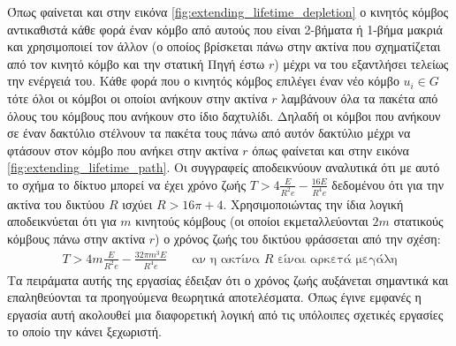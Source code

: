 Όπως φαίνεται και στην εικόνα \ref{fig:extending_lifetime_depletion} ο κινητός κόμβος αντικαθιστά κάθε φορά έναν κόμβο από αυτούς που είναι 2-βήματα ή 1-βήμα μακριά
και χρησιμοποιεί τον άλλον (ο οποίος βρίσκεται πάνω στην ακτίνα που σχηματίζεται από τον κινητό κόμβο και την στατική Πηγή έστω $r$) μέχρι να του εξαντλήσει τελείως
την ενέργειά του. Κάθε φορά που ο κινητός κόμβος επιλέγει έναν νέο κόμβο $u_{i}\in G$ τότε όλοι οι κόμβοι οι οποίοι ανήκουν στην ακτίνα $r$ λαμβάνουν όλα τα πακέτα
από όλους του κόμβους που ανήκουν στο ίδιο δαχτυλίδι. Δηλαδή οι κόμβοι που ανήκουν σε έναν δακτύλιο στέλνουν τα πακέτα τους πάνω από αυτόν δακτύλιο μέχρι να φτάσουν
στον κόμβο που ανήκει στην ακτίνα $r$ όπως φαίνεται και στην εικόνα \ref{fig:extending_lifetime_path}. Οι συγγραφείς αποδεικνύουν αναλυτικά ότι με αυτό το σχήμα το
δίκτυο μπορεί να έχει χρόνο ζωής  $T>4\frac{E}{R^{2}e}-\frac{16E}{R^{4}e}$ δεδομένου ότι για την ακτίνα του δικτύου $R$ ισχύει $R>16\pi+4$. Χρησιμοποιώντας την ίδια
λογική αποδεικνύεται ότι για $m$ κινητούς κόμβους (οι οποίοι εκμεταλλεύονται $2m$ στατικούς κόμβους πάνω στην ακτίνα $r$) ο χρόνος ζωής του δικτύου φράσσεται από την
σχέση:
\begin{align*}
T>4m\frac{E}{R^{2}e}-\frac{32\pi m^{3}E}{R^{4}e} \qquad\text{αν η ακτίνα $R$ είναι αρκετά μεγάλη}
\end{align*}
Τα πειράματα αυτής της εργασίας έδειξαν ότι ο χρόνος ζωής αυξάνεται σημαντικά και επαληθεύονται τα προηγούμενα θεωρητικά αποτελέσματα. Όπως έγινε εμφανές η εργασία
αυτή ακολουθεί μια διαφορετική λογική από τις υπόλοιπες σχετικές εργασίες το οποίο την κάνει ξεχωριστή.

